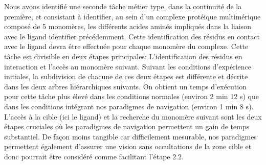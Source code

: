 Nous avons identifié une seconde tâche métier type, dans la continuité de la première, et consistant à identifier, au sein d'un complexe protéique multimérique composé de 5 monomères, les différents acides aminés impliqués dans la liaison avec le ligand identifier précédemment. Cette identification des résidus en contact avec le ligand devra être effectuée pour chaque monomère du complexe. Cette tâche est divisible en deux étapes principales: L'identification des résidus en interaction et l'accès au monomère suivant. Suivant les conditions d'expérience initiales, la subdivision de chacune de ces deux étapes est différente et décrite dans les deux arbres hiérarchiques suivants. On obtient un temps d’exécution pour cette tâche plus élevé dans les conditions normales (environ 2 min 12 s) que dans les conditions intégrant nos paradigmes de navigation (environ 1 min 8 s). L'accès à la cible (ici le ligand) et la recherche du monomère suivant sont les deux étapes cruciales où les paradigmes de navigation permettent un gain de temps substantiel. De façon moins tangible car difficilement mesurable, nos paradigmes permettent également d'assurer une vision sans occultations de la zone cible et donc pourrait être considéré comme facilitant l'étape 2.2.
\\
\\
